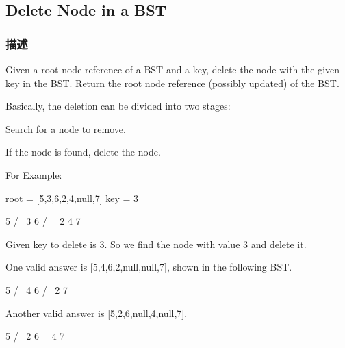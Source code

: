 \subsection{Delete Node in a BST}
\label{sec:delete-node-in-a-bst}

\subsubsection{描述}
Given a root node reference of a BST and a key, delete the node with the given key in the BST. Return the root node reference (possibly updated) of the BST.

Basically, the deletion can be divided into two stages:

\begindot
\item Search for a node to remove.
\item If the node is found, delete the node.
\myenddot

For Example:
\begin{Code}
root = [5,3,6,2,4,null,7]
key = 3

    5
   / \
  3   6
 / \   \
2   4   7

Given key to delete is 3. So we find the node with value 3 and delete it.

One valid answer is [5,4,6,2,null,null,7], shown in the following BST.

    5
   / \
  4   6
 /     \
2       7

Another valid answer is [5,2,6,null,4,null,7].

    5
   / \
  2   6
   \   \
    4   7
\end{Code}




